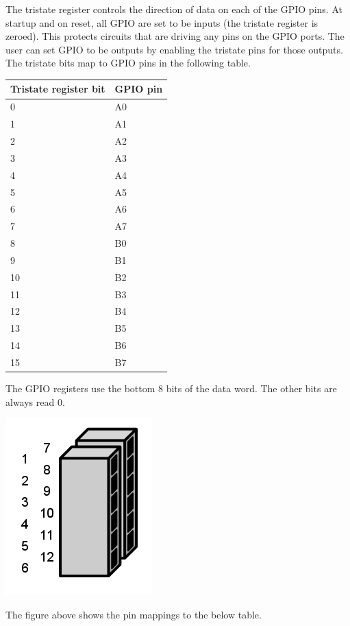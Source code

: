 \documentclass{article}
\begin{document}
The tristate register controls the direction of data on each of the GPIO pins. At startup and on reset, all GPIO are set to be inputs (the tristate register is zeroed). This protects circuits that are driving any pins on the GPIO ports. The user can set GPIO to be outputs by enabling the tristate pins for those outputs. The tristate bits map to GPIO pins in the following table. 

\begin{tabular}{ | l | l |}
\hline
Tristate register bit &	GPIO pin \\
\hline
0 & A0 \\
1 & A1 \\
2 & A2 \\
3 & A3 \\
4 & A4 \\
5 & A5 \\
6 & A6 \\
7 & A7 \\
8 & B0 \\
9 & B1 \\
10 & B2 \\
11 & B3 \\
12 & B4 \\
13 & B5 \\
14 & B6 \\
15 & B7 \\
\hline
\end{tabular}

The GPIO registers use the bottom 8 bits of the data word. The other bits are always read 0. 

\begin{center}
\includegraphics[scale=0.5]{../../images/GPIO.png}
\end{center}

The figure above shows the pin mappings to the below table. 
\end{document}
